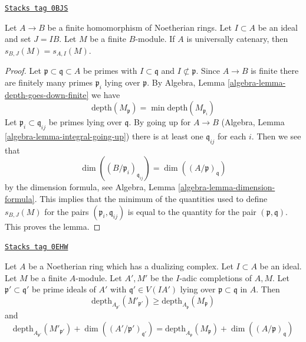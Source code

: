 \begin{lemma}[Cutoff]
\label{local-cohomology-lemma-cutoff}
\href{https://stacks.math.columbia.edu/tag/0BJS}{\texttt{Stacks tag 0BJS}}

Let $A \to B$ be a finite homomorphism of Noetherian rings.
Let $I \subset A$ be an ideal and set $J = IB$. Let $M$ be
a finite $B$-module. If $A$ is universally catenary, then
$s_{B, J}(M) = s_{A, I}(M)$.
\end{lemma}

\begin{proof}
Let $\mathfrak p \subset \mathfrak q \subset A$ be primes with
$I \subset \mathfrak q$ and $I \not \subset \mathfrak p$.
Since $A \to B$ is finite there are finitely many primes
$\mathfrak p_i$ lying over $\mathfrak p$. By
Algebra, Lemma \ref{algebra-lemma-depth-goes-down-finite}
we have
$$
\text{depth}(M_\mathfrak p) = \min \text{depth}(M_{\mathfrak p_i})
$$
Let $\mathfrak p_i \subset \mathfrak q_{ij}$ be primes lying
over $\mathfrak q$. By going up for $A \to B$
(Algebra, Lemma \ref{algebra-lemma-integral-going-up})
there is at least one $\mathfrak q_{ij}$ for each $i$.
Then we see that
$$
\dim((B/\mathfrak p_i)_{\mathfrak q_{ij}}) =
\dim((A/\mathfrak p)_\mathfrak q)
$$
by the dimension formula, see
Algebra, Lemma \ref{algebra-lemma-dimension-formula}.
This implies that the minimum of the quantities
used to define $s_{B, J}(M)$
for the pairs $(\mathfrak p_i, \mathfrak q_{ij})$
is equal to the quantity for the pair $(\mathfrak p, \mathfrak q)$.
This proves the lemma.
\end{proof}

\begin{lemma}
\label{local-cohomology-lemma-change-completion}
\href{https://stacks.math.columbia.edu/tag/0EHW}{\texttt{Stacks tag 0EHW}}

Let $A$ be a Noetherian ring which has a dualizing complex.
Let $I \subset A$ be an ideal.
Let $M$ be a finite $A$-module. Let $A', M'$ be the $I$-adic
completions of $A, M$. Let $\mathfrak p' \subset \mathfrak q'$
be prime ideals of $A'$ with $\mathfrak q' \in V(IA')$
lying over $\mathfrak p \subset \mathfrak q$ in $A$. Then
$$
\text{depth}_{A_{\mathfrak p'}}(M'_{\mathfrak p'})
\geq
\text{depth}_{A_\mathfrak p}(M_\mathfrak p)
$$
and
$$
\text{depth}_{A_{\mathfrak p'}}(M'_{\mathfrak p'}) +
\dim((A'/\mathfrak p')_{\mathfrak q'}) =
\text{depth}_{A_\mathfrak p}(M_\mathfrak p) +
\dim((A/\mathfrak p)_\mathfrak q)
$$
\end{lemma}

